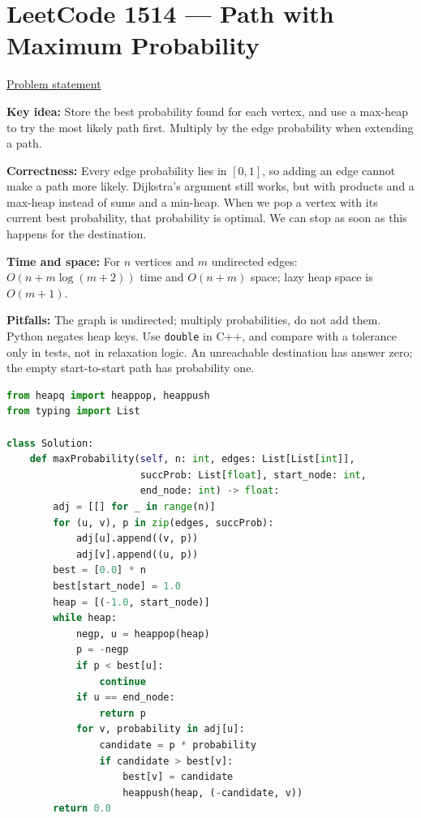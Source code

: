 \documentclass[11pt]{article}
\newcommand{\insight}[1]{\par\medskip\noindent\textbf{Key idea:} #1}
\newcommand{\correct}[1]{\par\textbf{Correctness:} #1}
\newcommand{\bounds}[1]{\par\textbf{Time and space:} #1}
\newcommand{\pitfalls}[1]{\par\textbf{Pitfalls:} #1}
\begin{document}
\section{LeetCode 1514 --- Path with Maximum Probability}
\href{https://leetcode.com/problems/path-with-maximum-probability/}{Problem statement}
\insight{Store the best probability found for each vertex, and use a max-heap to try the most likely path first. Multiply by the edge probability when extending a path.}
\correct{Every edge probability lies in $[0,1]$, so adding an edge cannot make a path more likely. Dijkstra's argument still works, but with products and a max-heap instead of sums and a min-heap. When we pop a vertex with its current best probability, that probability is optimal. We can stop as soon as this happens for the destination.}
\bounds{For $n$ vertices and $m$ undirected edges: $O(n+m\log(m+2))$ time and $O(n+m)$ space; lazy heap space is $O(m+1)$.}
\pitfalls{The graph is undirected; multiply probabilities, do not add them. Python negates heap keys. Use \texttt{double} in C++, and compare with a tolerance only in tests, not in relaxation logic. An unreachable destination has answer zero; the empty start-to-start path has probability one.}
\begin{lstlisting}[language=Python,caption={P04 --- Python 3},label={lst:p04-python}]
from heapq import heappop, heappush
from typing import List

class Solution:
    def maxProbability(self, n: int, edges: List[List[int]],
                       succProb: List[float], start_node: int,
                       end_node: int) -> float:
        adj = [[] for _ in range(n)]
        for (u, v), p in zip(edges, succProb):
            adj[u].append((v, p))
            adj[v].append((u, p))
        best = [0.0] * n
        best[start_node] = 1.0
        heap = [(-1.0, start_node)]
        while heap:
            negp, u = heappop(heap)
            p = -negp
            if p < best[u]:
                continue
            if u == end_node:
                return p
            for v, probability in adj[u]:
                candidate = p * probability
                if candidate > best[v]:
                    best[v] = candidate
                    heappush(heap, (-candidate, v))
        return 0.0
\end{lstlisting}
\end{document}
